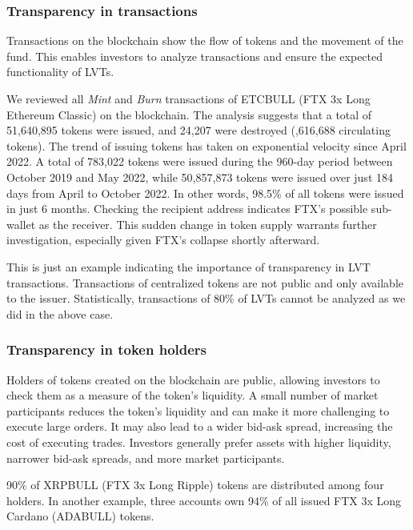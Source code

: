 \subsubsection{Transparency in transactions}
Transactions on the blockchain show the flow of tokens and the movement of the fund. This enables investors to analyze transactions and ensure the expected functionality of LVTs.

\begin{example}
	We reviewed all \textsl{Mint} and \textsl{Burn} transactions of ETCBULL (FTX 3x Long Ethereum Classic) on the blockchain. The analysis suggests that a total of 51,640,895 tokens were issued, and 24,207 were destroyed (,616,688 circulating tokens). The trend of issuing tokens has taken on exponential velocity since April 2022. A total of 783,022 tokens were issued during the 960-day period between October 2019 and May 2022, while 50,857,873 tokens were issued over just 184 days from April to October 2022. In other words, 98.5\% of all tokens were issued in just 6 months. Checking the recipient address indicates FTX's possible sub-wallet as the receiver. This sudden change in token supply warrants further investigation, especially given FTX's collapse shortly afterward.
\end{example}

This is just an example indicating the importance of transparency in LVT transactions. Transactions of centralized tokens are not public and only available to the issuer. Statistically, transactions of 80\% of LVTs cannot be analyzed as we did in the above case.

\subsubsection{Transparency in token holders}
Holders of tokens created on the blockchain are public, allowing investors to check them as a measure of the token's liquidity. A small number of market participants reduces the token's liquidity and can make it more challenging to execute large orders. It may also lead to a wider bid-ask spread, increasing the cost of executing trades. Investors generally prefer assets with higher liquidity, narrower bid-ask spreads, and more market participants.
\begin{example}
	90\% of XRPBULL (FTX 3x Long Ripple) tokens are distributed among four holders. In another example, three accounts own 94\% of all issued FTX 3x Long Cardano (ADABULL) tokens.
\end{example}

